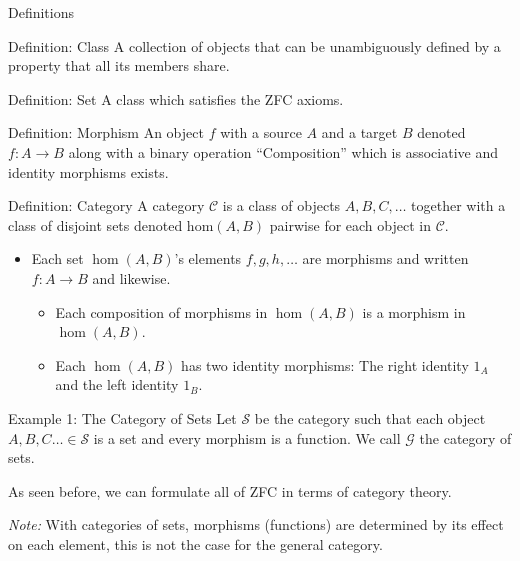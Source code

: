 \documentclass[12pt]{beamer}
\begin{document}
\begin{frame}{Definitions}
    
    \begin{block}{Definition: Class}
        A collection of objects that can be unambiguously defined by a property that all its members share.
    \end{block}
    
    \begin{block}{Definition: Set}
        A class which satisfies the ZFC axioms.
    \end{block}
    
    \begin{block}{Definition: Morphism}
        An object $f$ with a source $A$ and a target $B$ denoted $f:A\rightarrow B$ along with a binary operation ``Composition'' which is associative and identity morphisms exists.
    \end{block}
    
\end{frame}

\begin{frame}{Definition: Category}
    A category $\mathscr{C}$ is a class of objects $A,B,C,\dots$ together with a class of disjoint sets denoted hom$(A,B)$ pairwise for each object in $\mathscr{C}$.
    \begin{itemize}
        \item Each set $\hom(A,B)$'s elements $f,g,h,\dots$ are morphisms and written $f:A\rightarrow B$ and likewise. 
        \begin{itemize}
            \item Each composition of morphisms in $\hom(A,B)$ is a morphism in $\hom(A,B)$.
            \item Each $\hom(A,B)$ has two identity morphisms: The right identity $1_A$ and the left identity $1_B$.
        \end{itemize}
    \end{itemize}
\end{frame}

\begin{frame}{Example 1: The Category of Sets}
    Let $\mathscr{S}$ be the category such that each object $A,B,C\dots\in\mathscr{S}$ is a set and every morphism is a function. We call $\mathcal{G}$ the category of sets.
    
    \quad
    
    As seen before, we can formulate all of ZFC in terms of category theory.
    
    \quad
    
    \textit{Note:} With categories of sets, morphisms (functions) are determined by its effect on each element, this is not the case for the general category.
\end{frame}
\end{document}
